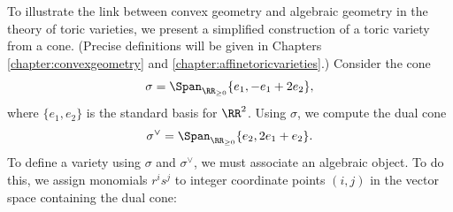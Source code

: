 \documentclass[12pt]{amsart}
\theoremstyle{plain}
\theoremstyle{definition}
\begin{document}
To illustrate the link between convex geometry and algebraic geometry in the theory of toric varieties, we present a simplified construction of a toric variety from a cone.
(Precise definitions will be given in Chapters \ref{chapter:convexgeometry} and \ref{chapter:affinetoricvarieties}.)
Consider the cone
$$\sigma = \Span_{\RR_{\ge 0}}\{e_1, -e_1+2e_2\},$$
where $\{e_1, e_2\}$ is the standard basis for $\RR^2$.
Using $\sigma$, we compute the dual cone
$$\sigma^\vee = \Span_{\RR_{\ge 0}}\{e_2, 2e_1+ e_2\}.$$
To define a variety using $\sigma$ and $\sigma^\vee$, we must associate an algebraic object.
To do this, we assign monomials $r^i s^j$ to integer coordinate points $(i, j)$ in the vector space containing the dual cone:
\begin{figure}[H]
    \centering
\end{figure}
\end{document}
